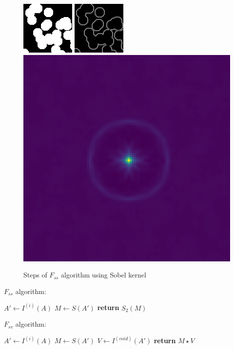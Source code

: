 \documentclass[reprint,amsmath,amssymb,aps,pre]{revtex4-1}
\begin{document}
\begin{figure}
  \centering
  \includegraphics[width=0.32\linewidth]{images/original.png}
  \includegraphics[width=0.32\linewidth]{images/sobel.png}
  \includegraphics[width=0.32\linewidth]{images/Fss_map_sobel.png}
  \caption{Steps of $F_{ss}$ algorithm using Sobel kernel}
  \label{fig:Fss_algo}
\end{figure}

$F_{ss}$ algorithm:
\begin{algorithmic}[1]
  \State $A' \gets I^{(i)}(A)$
  \State $M \gets S(A')$
  \State \textbf{return} $S_2(M)$
  \EndProcedure
\end{algorithmic}

$F_{sv}$ algorithm:
\begin{algorithmic}[1]
  \State $A' \gets I^{(i)}(A)$
  \State $M \gets S(A')$
  \State $V \gets I^{(void)}(A')$
  \State \textbf{return} $M \star V$
  \EndProcedure
\end{algorithmic}
\end{document}
